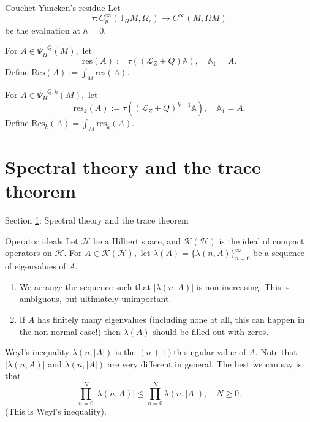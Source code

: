 \documentclass{beamer}
\numberwithin{equation}{section}
\theoremstyle{plain}
\theoremstyle{plain}
\theoremstyle{definition}
\theoremstyle{plain}
\theoremstyle{plain}
\theoremstyle{definition}
\newcommand{\Hc}{\mathcal{H}}
\newcommand{\Kc}{\mathcal{K}}
\newcommand{\Lc}{\mathcal{L}}
\newcommand{\Res}{\mathrm{Res}}
\newcommand{\Tb}{\mathbb{T}}
\newcommand{\Ab}{\mathbb{A}}
\newcommand{\res}{\mathrm{res}}
\begin{document}
\begin{frame}{Couchet-Yuncken's residue}
    Let
    \[
        \tau:C^\infty_p(\Tb_HM,\Omega_r)\to C^\infty(M,\Omega M)
    \]
    be the evaluation at $h=0.$
    \begin{definition}
        For $A \in \Psi^{-Q}_H(M),$ let
        \[
            \res(A) := \tau((\Lc_Z+Q)\Ab),\quad \Ab_1=A.
        \]
        Define $\Res(A) := \int_M \res(A).$
    \end{definition}
\end{frame}

\begin{frame}
    \begin{definition}
        For $A \in \Psi^{-Q,k}_H(M),$ let
        \[
            \res_k(A) := \tau((\Lc_Z+Q)^{k+1}\Ab),\quad \Ab_1=A.
        \]
        Define $\Res_k(A) = \int_M \res_k(A).$
    \end{definition}
\end{frame}


\section{Spectral theory and the trace theorem}\label{spectral_section}

\begin{frame}
    \huge{Section \ref{spectral_section}: Spectral theory and the trace theorem}
\end{frame}

\begin{frame}{Operator ideals}
    Let $\Hc$ be a Hilbert space, and $\Kc(\Hc)$ is the ideal of compact operators on $\Hc.$ For $A\in \Kc(\Hc),$ let $\lambda(A) = \{\lambda(n,A)\}_{n=0}^\infty$ be a sequence of eigenvalues of $A.$
    \begin{enumerate}
        \item{} We arrange the sequence such that $|\lambda(n,A)|$ is non-increasing. This is ambiguous, but ultimately unimportant.
        \item{} If $A$ has finitely many eigenvalues (including none at all, this can happen in the non-normal case!) then $\lambda(A)$ should be filled out with zeros.
    \end{enumerate}
\end{frame}

\begin{frame}{Weyl's inequality}
    $\lambda(n,|A|)$ is the $(n+1)$th singular value of $A.$ Note that $|\lambda(n,A)|$ and $\lambda(n,|A|)$ are very different in general. The best we can say is that
    \[
        \prod_{n=0}^N |\lambda(n,A)| \leq \prod_{n=0}^N \lambda(n,|A|),\quad N\geq 0.
    \]
    (This is Weyl's inequality).
\end{frame}
\end{document}
